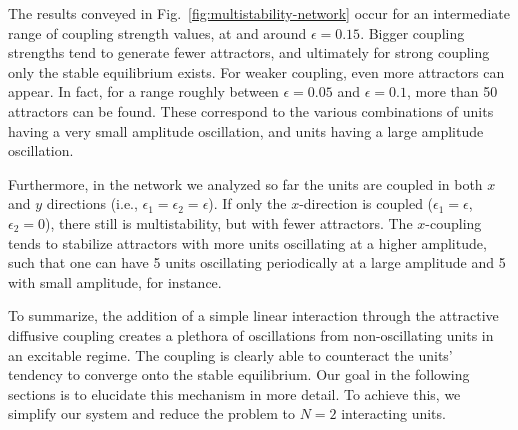 The results conveyed in Fig.~\ref{fig:multistability-network} occur for an intermediate range of coupling strength values, at and around $\epsilon=0.15$. Bigger coupling strengths tend to generate fewer attractors, and ultimately for strong coupling only the stable equilibrium exists. For weaker coupling, even more attractors can appear. In fact, for a range roughly between $\epsilon=0.05$ and $\epsilon=0.1$, more than 50 attractors can be found. These correspond to the various combinations of units having a very small amplitude oscillation, and units having a large amplitude oscillation.

Furthermore, in the network we analyzed so far the units are coupled in both $x$ and $y$ directions (i.e., $\epsilon_1=\epsilon_2=\epsilon$). If only the $x$-direction is coupled ($\epsilon_1=\epsilon$, $\epsilon_2=0$), there still is multistability, but with fewer attractors. The $x$-coupling tends to stabilize attractors with more units oscillating at a higher amplitude, such that one can have 5 units oscillating periodically at a large amplitude and 5 with small amplitude, for instance.

To summarize, the addition of a simple linear interaction through the attractive diffusive coupling creates a plethora of oscillations from non-oscillating units in an excitable regime. The coupling is clearly able to counteract the units' tendency to converge onto the stable equilibrium. Our goal in the following sections is to elucidate this mechanism in more detail. To achieve this, we simplify our system and reduce the problem to $N=2$ interacting units.


